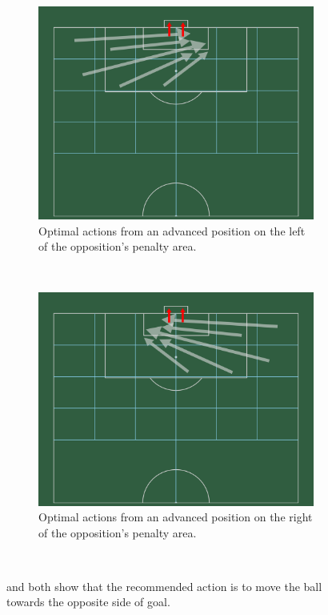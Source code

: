 \documentclass{l4proj}
\begin{document}
\begin{figure}[htb] 
    \centering
    \begin{subfigure}[b]{0.45\textwidth}
        \includegraphics[width=\textwidth]{images/backpostL.png}
        \caption{Optimal actions from an advanced position on the left of the opposition's penalty area.}
        \label{fig:bsticka}
    \end{subfigure}
    ~
    \begin{subfigure}[b]{0.45\textwidth}
        \includegraphics[width=\textwidth]{images/backpostR.png}
        \caption{Optimal actions from an advanced position on the right of the opposition's penalty area.}
        \label{fig:bstickb}
    \end{subfigure}
    ~   
    \caption{ and  both show that the recommended action is to move the ball towards the opposite side of goal.}
    \label{fig:wzbp}
\end{figure}
\end{document}

